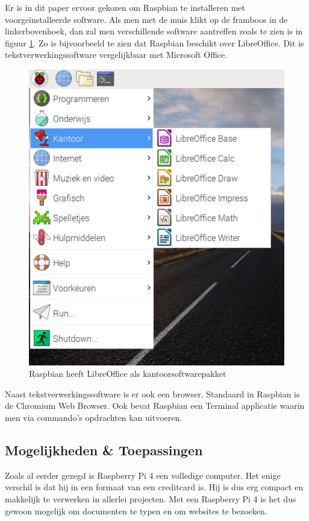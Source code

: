 \documentclass[a4paper, dutch, abstract=true]{scrartcl}
\begin{document}
Er is in dit paper ervoor gekozen om Raspbian te installeren met voorge{\"i}nstalleerde software.
Als men met de muis klikt op de framboos in de linkerbovenhoek, dan zal men verschillende software
aantreffen zoals te zien is in figuur \ref{fig:raspbian-libreoffice}.
Zo is bijvoorbeeld te zien dat Raspbian beschikt over LibreOffice.
Dit is tekstverwerkingssoftware vergelijkbaar met Microsoft Office.
\begin{figure}[h]
    \centering
    \includegraphics[scale=0.5]{raspbian-libreoffice.png}
    \caption{Raspbian heeft LibreOffice als kantoorsoftwarepakket}
    \label{fig:raspbian-libreoffice}
\end{figure}

Naast tekstverwerkingssoftware is er ook een browser.
Standaard in Raspbian is de Chromium Web Browser.
Ook bevat Raspbian een Terminal applicatie waarin men via commando's opdrachten kan uitvoeren.

\subsection{Mogelijkheden \& Toepassingen}
Zoals al eerder gezegd is Raspberry Pi 4 een volledige computer.
Het enige verschil is dat hij in een formaat van een creditcard is.
Hij is dus erg compact en makkelijk te verwerken in allerlei projecten.
Met een Raspberry Pi 4 is het dus gewoon mogelijk om documenten te typen en om websites te bezoeken.
\end{document}
